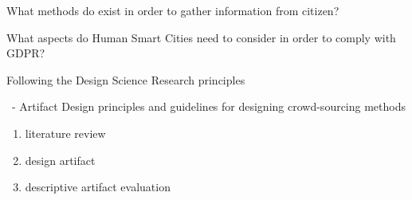 \documentclass[12pt,aspectratio=169]{beamer}
\begin{document}
\begin{frame}{\TT}
	\begin{block}{\RQ}
		What methods do exist in order to gather information from citizen?
	\end{block}
\end{frame}

\begin{frame}{\TT}
	\begin{block}{\RQ}
		What aspects do Human Smart Cities need to consider in order to comply with GDPR?
	\end{block}
\end{frame}

\begin{frame}{\TT}
	\begin{block}{\MT}
		Following the Design Science Research principles
	\end{block}
\end{frame}

\begin{frame}{\TT}
	\begin{block}{\MT \ - Artifact}
		Design principles and guidelines for designing crowd-sourcing methods
	\end{block}
\end{frame}

\begin{frame}{\TT}
	\begin{block}{\MT}
		\begin{enumerate}[-]
			\item literature review
			\item design artifact
			\item descriptive artifact evaluation
		\end{enumerate}
	\end{block}
\end{frame}
\end{document}
